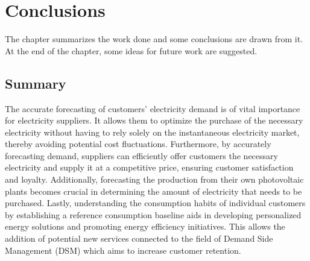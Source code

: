 \chapter{Conclusions}
\label{cha:conclusions}
\vspace{0.4 cm}

The chapter summarizes the work done and some conclusions are drawn from it.
At the end of the chapter, some ideas for future work are suggested.


\section{Summary}
\label{sec:summary}
\vspace{0.2 cm}

The accurate forecasting of customers’ electricity demand is of vital importance for electricity suppliers.
It allows them to optimize the purchase of the necessary electricity without having to rely solely on the instantaneous electricity market, thereby avoiding potential cost fluctuations.
Furthermore, by accurately forecasting demand, suppliers can efficiently offer customers the necessary electricity and supply it at a competitive price, ensuring customer satisfaction and loyalty.
Additionally, forecasting the production from their own photovoltaic plants becomes crucial in determining the amount of electricity that needs to be purchased.
Lastly, understanding the consumption habits of individual customers by establishing a reference consumption baseline aids in developing personalized energy solutions and promoting energy efficiency initiatives.
This allows the addition of potential new services connected to the field of Demand Side Management (DSM) which aims to increase customer retention.


